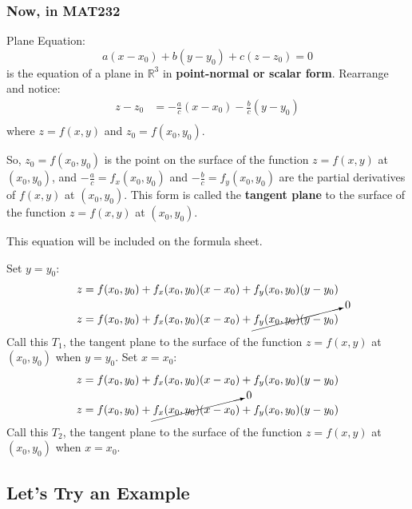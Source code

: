 \documentclass{article}
\begin{document}
\subsubsection*{Now, in MAT232}

\begin{definitionbox}
    Plane Equation:
    \[
        a(x - x_0) + b(y - y_0) + c(z - z_0) = 0
    \]
    is the equation of a plane in $\mathbb{R}^3$ in \textbf{point-normal or scalar form}.
    Rearrange and notice:
    \begin{align*}
        z - z_0 &= -\frac{a}{c}(x - x_0) - \frac{b}{c}(y - y_0) \\
    \end{align*}
    where \( z = f(x, y) \) and \( z_0 = f(x_0, y_0) \).

    So, \( z_0 = f(x_0, y_0) \) is the point on the surface of the function \( z = f(x, y) \) at \( (x_0, y_0) \), and \( -\frac{a}{c} = f_x(x_0, y_0) \) and \( -\frac{b}{c} = f_y(x_0, y_0) \) are the partial derivatives of \( f(x, y) \) at \( (x_0, y_0) \).
    This form is called the \textbf{tangent plane} to the surface of the function \( z = f(x, y) \) at \( (x_0, y_0) \).
    \begin{notebox}
    This equation will be included on the formula sheet.
    \end{notebox}
\end{definitionbox}

\begin{conceptbox}
Set \( y = y_0 \):
\begin{align*}
    z = f(x_0, y_0) + f_x(x_0, y_0)(x - x_0) + f_y(x_0, y_0)(y - y_0) \\
    z = f(x_0, y_0) + f_x(x_0, y_0)(x - x_0) + \cancelto{0}{f_y(x_0, y_0)(y - y_0)}
\end{align*}
Call this \( T_1 \), the tangent plane to the surface of the function \( z = f(x, y) \) at \( (x_0, y_0) \) when \( y = y_0 \).
\bigskip
Set \( x = x_0 \):
\begin{align*}
    z = f(x_0, y_0) + f_x(x_0, y_0)(x - x_0) + f_y(x_0, y_0)(y - y_0) \\
    z = f(x_0, y_0) + \cancelto{0}{f_x(x_0, y_0)(x - x_0)} + f_y(x_0, y_0)(y - y_0)
\end{align*}
Call this \( T_2 \), the tangent plane to the surface of the function \( z = f(x, y) \) at \( (x_0, y_0) \) when \( x = x_0 \).
\end{conceptbox}

\subsection*{Let's Try an Example}
\end{document}
